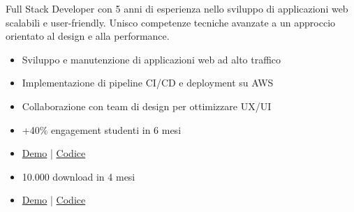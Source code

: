 \documentclass[10pt,a4paper]{altacv}
\begin{document}
\makecvheader

Full Stack Developer con 5 anni di esperienza nello sviluppo di applicazioni web scalabili e user-friendly. Unisco competenze tecniche avanzate a un approccio orientato al design e alla performance.

\begin{itemize}
\item Sviluppo e manutenzione di applicazioni web ad alto traffico
\item Implementazione di pipeline CI/CD e deployment su AWS
\item Collaborazione con team di design per ottimizzare UX/UI
\end{itemize}

\begin{itemize}
\item +40\% engagement studenti in 6 mesi
\item \href{#}{Demo} | \href{#}{Codice}
\end{itemize}

\divider

\begin{itemize}
\item 10.000 download in 4 mesi
\item \href{#}{Demo} | \href{#}{Codice}
\end{itemize}

        
\end{document}
